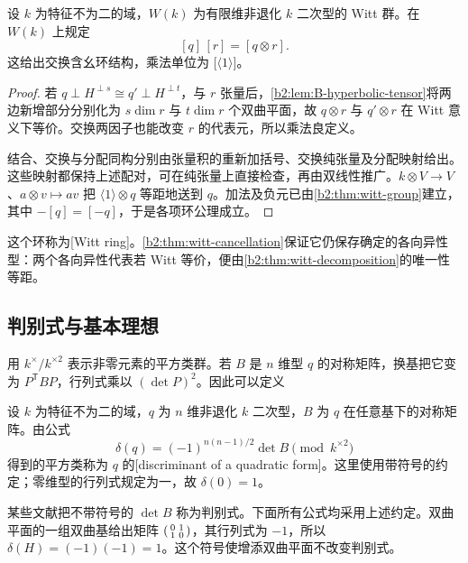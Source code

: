 \begin{theorem}\label{b2:thm:B-witt-ring}
	设 \(k\) 为特征不为二的域，\(W(k)\) 为有限维非退化 \(k\) 二次型的 Witt 群。在 \(W(k)\) 上规定
	\[
		[q]\,[r]=[q\otimes r].
	\]
	这给出交换含幺环结构，乘法单位为 \(\bigl[\langle1\rangle\bigr]\)。
\end{theorem}
\begin{proof}
	若 \(q\perp H^{\perp s}\cong q'\perp H^{\perp t}\)，与 \(r\) 张量后，\cref{b2:lem:B-hyperbolic-tensor}将两边新增部分分别化为 \(s\dim r\) 与 \(t\dim r\) 个双曲平面，故 \(q\otimes r\) 与 \(q'\otimes r\) 在 Witt 意义下等价。交换两因子也能改变 \(r\) 的代表元，所以乘法良定义。

	结合、交换与分配同构分别由张量积的重新加括号、交换纯张量及分配映射给出。这些映射都保持上述配对，可在纯张量上直接检查，再由双线性推广。\(k\otimes V\to V\)、\(a\otimes v\mapsto av\) 把 \(\langle1\rangle\otimes q\) 等距地送到 \(q\)。加法及负元已由\cref{b2:thm:witt-group}建立，其中 \(-[q]=[-q]\)，于是各项环公理成立。
\end{proof}

这个环称为[Witt ring]。\cref{b2:thm:witt-cancellation}保证它仍保存确定的各向异性型：两个各向异性代表若 Witt 等价，便由\cref{b2:thm:witt-decomposition}的唯一性等距。

\subsection{判别式与基本理想}
\label{b2:subsec:B02:02}

用 \(k^\times/k^{\times2}\) 表示非零元素的平方类群。若 \(B\) 是 \(n\) 维型 \(q\) 的对称矩阵，换基把它变为 \(P^{\mathsf T}BP\)，行列式乘以 \((\det P)^2\)。因此可以定义
\begin{definition}\label{b2:def:B-signed-discriminant}
	设 \(k\) 为特征不为二的域，\(q\) 为 \(n\) 维非退化 \(k\) 二次型，\(B\) 为 \(q\) 在任意基下的对称矩阵。由公式
	\[
		\delta(q)=(-1)^{n(n-1)/2}\det B\pmod{k^{\times2}}
	\]
	得到的平方类称为 \(q\) 的[discriminant of a quadratic form]。这里使用带符号的约定；零维型的行列式规定为一，故 \(\delta(0)=1\)。
\end{definition}

某些文献把不带符号的 \(\det B\) 称为判别式。下面所有公式均采用上述约定。双曲平面的一组双曲基给出矩阵 \(\begin{psmallmatrix}0&1\\1&0\end{psmallmatrix}\)，其行列式为 \(-1\)，所以 \(\delta(H)=(-1)(-1)=1\)。这个符号使增添双曲平面不改变判别式。

